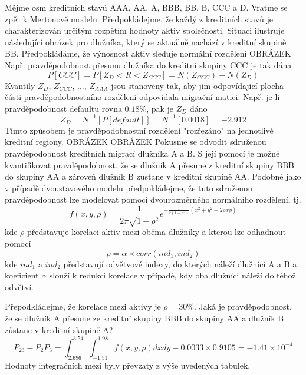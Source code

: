 Mějme osm kreditních stavů AAA, AA, A, BBB, BB, B, CCC a D. Vraťme se zpět k Mertonově modelu. Předpokládejme, že každý z kreditních stavů je charakterizován určitým rozpětím hodnoty aktiv společnosti. Situaci ilustruje následující obrázek pro dlužníka, který se aktuálně nachází v kreditní skupině BB. Předpokládáme, že výnosnost aktiv sleduje normální rozdělení
OBRÁZEK
Např. pravděpodobnost přesunu dlužníka do kreditní skupiny CCC je tak dána
\begin{equation*}
P[CCC] = P[Z_D < R < Z_{CCC}] = N(Z_{CCC}) - N(Z_D)
\end{equation*}
Kvantily $Z_D$, $Z_{CCC}$, ..., $Z_{AAA}$ jsou stanoveny tak, aby jim odpovídající plocha části pravděpodobnostního rozdělení odpovídala migrační matici. Např. je-li pravděpodobnost defaultu rovna $0.18\%$, pak je $Z_D$ dáno
\begin{equation*}
Z_D = N^{-1}[P[default]] = N^{-1}[0.0018] = -2.912
\end{equation*}
Tímto způsobem je pravděpodobnostní rozdělení "rozřezáno" na jednotlivé kreditní regiony.
OBRÁZEK
OBRÁZEK
Pokusme se odvodit sdruženou pravděpodobnost kreditních migrací dlužníka A a B. S její pomocí je možné kvantifikovat pravděpodobnost, že se dlužník A přesune z kreditní skupiny BBB do skupiny AA a zároveň dlužník B zůstane v kreditní skupině AA. Podobně jako v případě dvoustavového modelu předpokládejme, že tuto sdruženou pravděpodobnost lze modelovat pomocí dvourozměrného normálního rozdělení, tj.
\begin{equation*}
f(x, y, \rho) = \frac{1}{2 \pi \sqrt{1 - \rho^2}}e^{-\frac{1}{2(1 - \rho^2)}(x^2 + y^2 - 2\rho x y)}
\end{equation*}
kde $\rho$ představuje korelaci aktiv mezi oběma dlužníky a kterou lze odhadnout pomocí
\begin{equation*}
\rho = \alpha \times corr(ind_1, ind_2)
\end{equation*}
kde $ind_1$ a $ind_2$ představují odvětvové indexy, do kterých náleží dlužnící A a B a koeficient $\alpha$ slouží k redukci korelace v případě, kdy oba dlužníci náleží do téhož odvětví.

\begin{example}
Přepodkládejme, že korelace mezi aktivy je $\rho = 30\%$. Jaká je pravděpodobnost, že se dlužník A přesune ze kreditní skupiny BBB do skupiny AA a dlužník B zůstane v kreditní skupině A?
\begin{equation*}
P_{23} - P_2P_3 = \int_{2.696}^{3.54} \int_{-1.51}^{1.98}f(x,y,\rho)dxdy - 0.0033 \times 0.9105 = -1.41 \times 10^{-4}
\end{equation*}
Hodnoty integračních mezí byly převzaty z výše uvedených tabulek.
\end{example}
